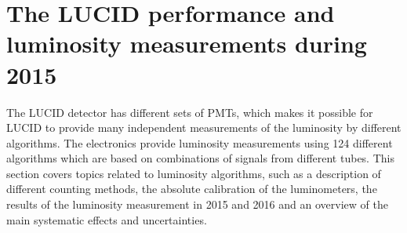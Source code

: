 
\section{The LUCID performance and luminosity measurements during 2015}
\label{sec:lucid_performance}

The LUCID detector has different sets of PMTs, which makes it possible for LUCID to provide many independent measurements of the luminosity by different algorithms.
The electronics provide luminosity measurements using 124 different algorithms which are based on combinations of signals from different tubes.
This section covers topics related to luminosity algorithms, such as a description of different counting methods, the absolute calibration of the luminometers, 
the results of the luminosity measurement in 2015 and 2016 and an overview of the main systematic effects and uncertainties.


